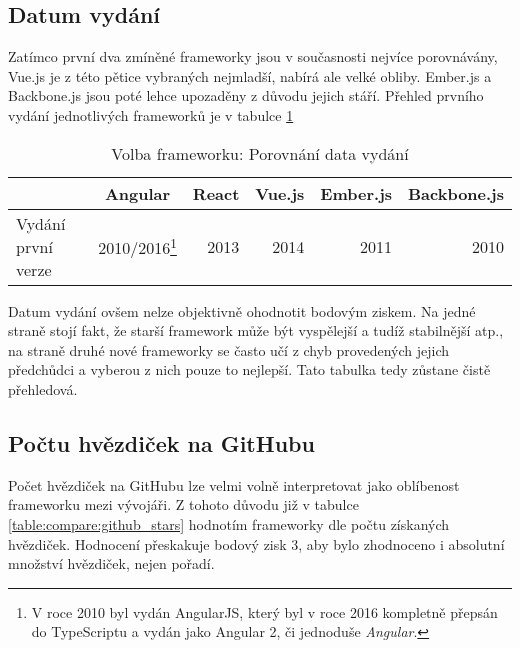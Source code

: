 
\subsection{Datum vydání}

Zatímco první dva zmíněné frameworky jsou v současnosti nejvíce porovnávány, Vue.js je z této pětice vybraných nejmladší, nabírá ale velké obliby. Ember.js a Backbone.js jsou poté lehce upozaděny z důvodu jejich stáří. Přehled prvního vydání jednotlivých frameworků je v tabulce \ref{table:compare:release}

\begin{table}[h]
\caption{Volba frameworku: Porovnání data vydání}
\label{table:compare:release}
\begin{tabular}{lrrrrr}
\hline
                                         & \multicolumn{1}{c}{Angular} & \multicolumn{1}{c}{React} & \multicolumn{1}{c}{Vue.js} & \multicolumn{1}{c}{Ember.js} & \multicolumn{1}{c}{Backbone.js} \\ \hline
Vydání první verze                       & 2010/2016\footnote{V roce 2010 byl vydán AngularJS, který byl v roce 2016 kompletně přepsán do TypeScriptu a vydán jako Angular 2, či jednoduše \emph{Angular}.}                                                                       & 2013                      & 2014                       & 2011                         & 2010                            \\
\end{tabular}
\end{table}

Datum vydání ovšem nelze objektivně ohodnotit bodovým ziskem. Na jedné straně stojí fakt, že starší framework může být vyspělejší a tudíž stabilnější atp., na straně druhé nové frameworky se často učí z chyb provedených jejich předchůdci a vyberou z nich pouze to nejlepší. Tato tabulka tedy zůstane čistě přehledová.


\subsection{Počtu hvězdiček na GitHubu}

Počet hvězdiček na GitHubu lze velmi volně interpretovat jako oblíbenost frameworku mezi vývojáři. Z tohoto důvodu již v tabulce \ref{table:compare:github_stars} hodnotím frameworky dle počtu získaných hvězdiček. Hodnocení přeskakuje bodový zisk 3, aby bylo zhodnoceno i absolutní množství hvězdiček, nejen pořadí.

